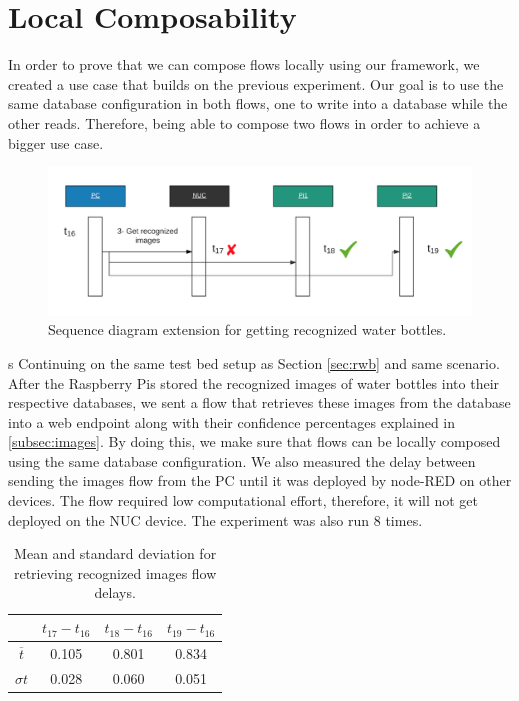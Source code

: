 \section{Local Composability}
In order to prove that we can compose flows locally using our framework, we created a use case that builds on the  previous experiment. Our goal is to use the same database configuration in both flows, one to write into a database while the other reads. Therefore, being able to compose two flows in order to achieve a bigger use case.\\
\begin{figure}[H]
	\centering
	\includegraphics[scale=0.6]{images/sequence-diagram-2.png}
	\caption{Sequence diagram  extension for getting recognized water bottles.}
	\label{fig:sd-images}
\end{figure} 
s
 \noindent Continuing on the same test bed setup as Section \ref{sec:rwb} and same scenario.  After the Raspberry Pis stored the recognized images of water bottles into their respective  databases, we sent a flow that retrieves these images from the database into a web endpoint along with their confidence percentages explained in \ref{subsec:images}. By doing this, we make sure that flows can be locally composed using the same database configuration. We also measured the delay between sending the images flow from the PC until it was deployed by node-RED on other devices. The flow required low computational effort, therefore, it will not get deployed on the NUC device. The experiment was also run 8 times.

\begin{table}[H]
\centering
\begin{tabular}{ c | c | c| c }	\toprule
&$t_{17} - t_{16}$  & $t_{18} - t_{16}$  & $t_{19}-t_{16}$ \\ \midrule
$ \overline{t} $&	0.105&	0.801&	0.834\\
$ \sigma t $&	0.028&	0.060&	0.051\\
\end{tabular}
\caption{Mean and standard deviation for retrieving recognized images flow delays.}
\label{table:images}
\end{table}

